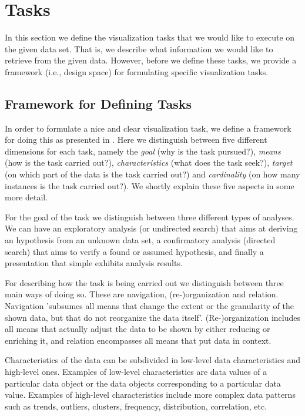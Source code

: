 \section{Tasks}\label{sec:tasks}

In this section we define the visualization tasks that we would like to execute on the given data set. That is, we describe what information we would like to retrieve from the given data. However, before we define these tasks, we provide a framework (i.e., design space) for formulating specific visualization tasks.

\subsection{Framework for Defining Tasks}
In order to formulate a nice and clear visualization task, we define a framework for doing this as presented in \cite{schulz2013design}. Here we distinguish between five different dimensions for each task, namely the \textit{goal} (why is the task pursued?), \textit{means} (how is the task carried out?), \textit{characteristics} (what does the task seek?), \textit{target} (on which part of the data is the task carried out?) and \textit{cardinality} (on how many instances is the task carried out?). We shortly explain these five aspects in some more detail.

For the goal of the task we distinguish between three different types of analyses. We can have an exploratory analysis (or undirected search) that aims at deriving an hypothesis from an unknown data set, a confirmatory analysis (directed search) that aims to verify a found or assumed hypothesis, and finally a presentation that simple exhibits analysis results.

For describing how the task is being carried out we distinguish between three main ways of doing so. These are navigation, (re-)organization and relation. Navigation 'subsumes all means that change the extent or the granularity of the shown data, but that do not reorganize the data itself'. (Re-)organization includes all means that actually adjust the data to be shown by either reducing or enriching it, and relation encompasses all means that put data in context.

Characteristics of the data can be subdivided in low-level data characteristics and high-level ones. Examples of low-level characteristics are data values of a particular data object or the data objects corresponding to a particular data value. Examples of high-level characteristics include more complex data patterns such as trends, outliers, clusters, frequency, distribution, correlation, etc.


